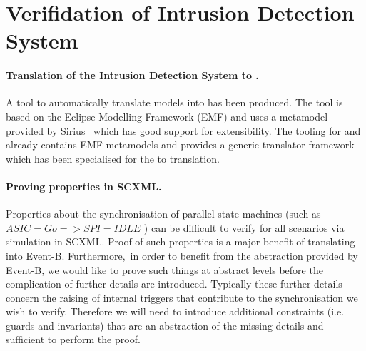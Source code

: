 
\section{Verifidation of Intrusion Detection System}
\label{sec:example}

\paragraph{Translation of the Intrusion Detection System to \EventB.}
A tool to automatically translate \SCXML models into \iUMLB has been produced. 
The tool is based on the Eclipse Modelling Framework (EMF) and uses a \SCXML metamodel provided by Sirius~\cite{siriuswebsite} which has good support for extensibility. 
The tooling for \iUMLB and \EventB already contains EMF metamodels and provides a generic translator framework which has been specialised for the \SCXML to \iUMLB translation. 

\paragraph{Proving properties in SCXML.}
Properties about the synchronisation of parallel state-machines (such as $ASIC=Go => SPI=IDLE$
) can be difficult to verify for all scenarios via simulation in SCXML. 
Proof of such properties is a major benefit of translating into Event-B.  
Furthermore, in order to benefit from the abstraction provided by Event-B, we would like to prove such things at abstract levels before the complication of further details are introduced. Typically these further details concern the raising of internal triggers that contribute to the synchronisation we wish to verify. Therefore we will need to introduce additional constraints (i.e. guards and invariants) that are an abstraction of the missing details and sufficient to perform the proof.

